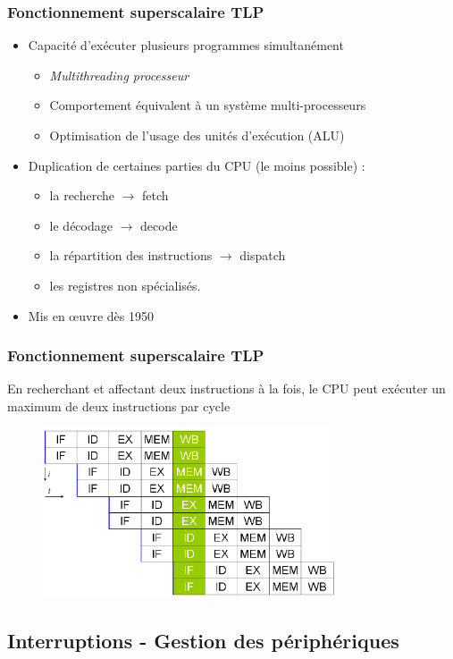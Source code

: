 \begin{frame}
\frametitle{Fonctionnement superscalaire TLP}
\begin{itemize}
\item Capacité d'exécuter plusieurs programmes simultanément
\begin{itemize}
\item \textit{Multithreading processeur}
\item Comportement équivalent à un système multi-processeurs
\item Optimisation de l'usage des unités d'exécution (ALU)
\end{itemize}
\item Duplication de certaines parties du CPU (le moins possible) :
\begin{itemize}
\item la recherche $\rightarrow$ fetch
\item le décodage $\rightarrow$ decode
\item la répartition des instructions $\rightarrow$ dispatch
\item les registres non spécialisés.
\end{itemize}
\item Mis en œuvre dès 1950 
\end{itemize}
\end{frame}

\begin{frame}
\frametitle{Fonctionnement superscalaire TLP}
En recherchant et affectant deux instructions à la fois, le CPU peut exécuter un maximum de deux instructions par cycle \cite{wp-cpu}
\begin{figure}
\includegraphics[height=5cm]{../illustration/Superscalarpipeline.png}
\end{figure}
\end{frame}


\subsection{Interruptions - Gestion des périphériques}

